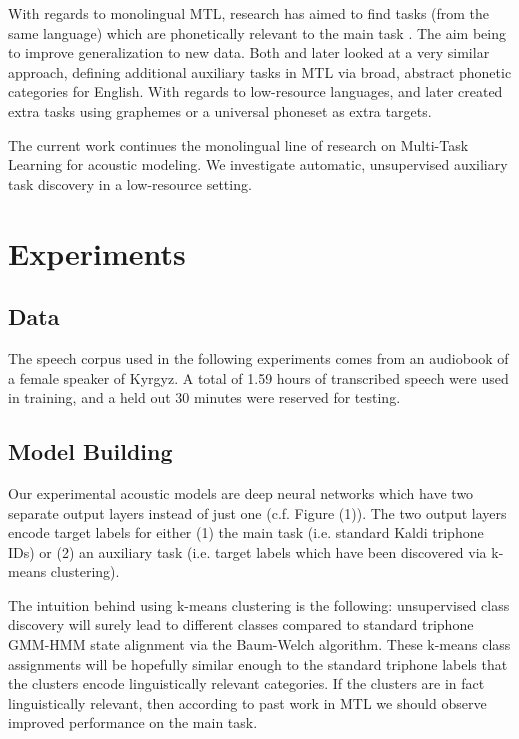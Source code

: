 \documentclass[a4paper]{article}
\begin{document}
With regards to monolingual MTL, research has aimed to find tasks (from the same language) which are phonetically relevant to the main task \cite{bell2015}. The aim being to improve generalization to new data. Both \cite{seltzer2013} and later \cite{huang2015} looked at a very similar approach, defining additional auxiliary tasks in MTL via broad, abstract phonetic categories for English. With regards to low-resource languages, \cite{chen2014} and later \cite{chen2015} created extra tasks using graphemes or a universal phoneset as extra targets.

The current work continues the monolingual line of research on Multi-Task Learning for acoustic modeling. We investigate automatic, unsupervised auxiliary task discovery in a low-resource setting.


\section{Experiments}


\subsection{Data}

The speech corpus used in the following experiments comes from an audiobook of a female speaker of Kyrgyz. A total of 1.59 hours of transcribed speech were used in training, and a held out 30 minutes were reserved for testing.


\subsection{Model Building}

Our experimental acoustic models are deep neural networks which have two separate output layers instead of just one (c.f. Figure (1)). The two output layers encode target labels for either (1) the main task (i.e. standard Kaldi triphone IDs) or (2) an auxiliary task (i.e. target labels which have been discovered via k-means clustering).

The intuition behind using k-means clustering is the following: unsupervised class discovery will surely lead to different classes compared to standard triphone GMM-HMM state alignment via the Baum-Welch algorithm. These k-means class assignments will be hopefully similar enough to the standard triphone labels that the clusters encode linguistically relevant categories. If the clusters are in fact linguistically relevant, then according to past work in MTL we should observe improved performance on the main task.
\end{document}
